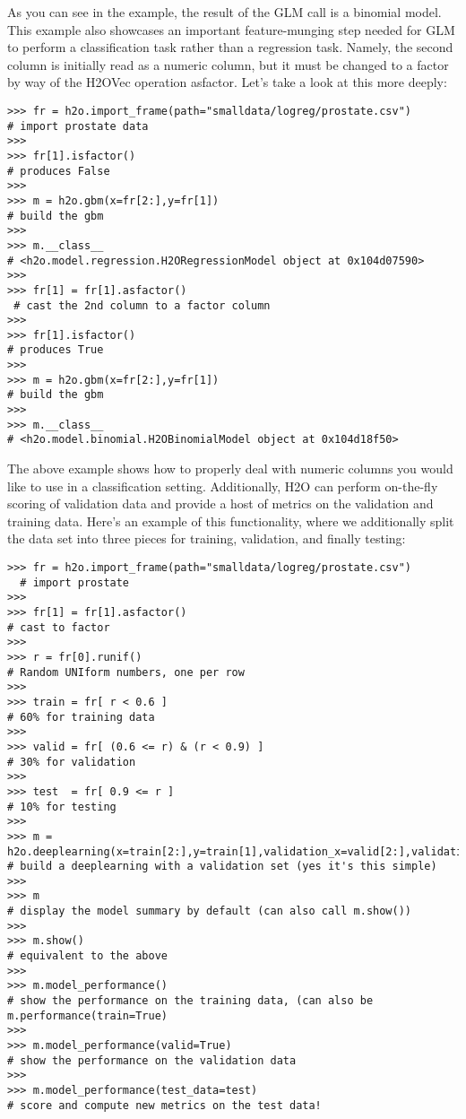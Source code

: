 As you can see in the example, the result of the GLM call is a binomial model. This example also showcases an important feature-munging step needed for GLM to perform a classification task rather than a regression task. Namely, the second column is initially read as a numeric column, but it must be changed to a factor by way of the H2OVec operation asfactor. Let's take a look at this more deeply:

\begin{lstlisting}[style=python]
>>> fr = h2o.import_frame(path="smalldata/logreg/prostate.csv")  
# import prostate data
>>>
>>> fr[1].isfactor()                                             
# produces False
>>>
>>> m = h2o.gbm(x=fr[2:],y=fr[1])                                
# build the gbm
>>>
>>> m.__class__                                                  
# <h2o.model.regression.H2ORegressionModel object at 0x104d07590>
>>>
>>> fr[1] = fr[1].asfactor()                                    
 # cast the 2nd column to a factor column
>>>
>>> fr[1].isfactor()                                             
# produces True
>>>
>>> m = h2o.gbm(x=fr[2:],y=fr[1])                                
# build the gbm
>>>
>>> m.__class__                                                  
# <h2o.model.binomial.H2OBinomialModel object at 0x104d18f50>
\end{lstlisting}


The above example shows how to properly deal with numeric columns you would like to use in a classification setting. Additionally, H2O can perform on-the-fly scoring of validation data and provide a host of metrics on the validation and training data. Here's an example of this functionality, where we additionally split the data set into three pieces for training, validation, and finally testing:
\begin{lstlisting}[style=python]
>>> fr = h2o.import_frame(path="smalldata/logreg/prostate.csv")
  # import prostate
>>>
>>> fr[1] = fr[1].asfactor()                                     
# cast to factor
>>>
>>> r = fr[0].runif()                                            
# Random UNIform numbers, one per row
>>>
>>> train = fr[ r < 0.6 ]                                        
# 60% for training data
>>>
>>> valid = fr[ (0.6 <= r) & (r < 0.9) ]                         
# 30% for validation
>>>
>>> test  = fr[ 0.9 <= r ]                                       
# 10% for testing
>>>
>>> m = h2o.deeplearning(x=train[2:],y=train[1],validation_x=valid[2:],validation_y=valid[1])  # build a deeplearning with a validation set (yes it's this simple)
>>>
>>> m                                                            
# display the model summary by default (can also call m.show())
>>>
>>> m.show()                                                     
# equivalent to the above
>>>
>>> m.model_performance()                                        
# show the performance on the training data, (can also be m.performance(train=True)
>>>
>>> m.model_performance(valid=True)                              
# show the performance on the validation data
>>>
>>> m.model_performance(test_data=test)                          
# score and compute new metrics on the test data!
\end{lstlisting}


